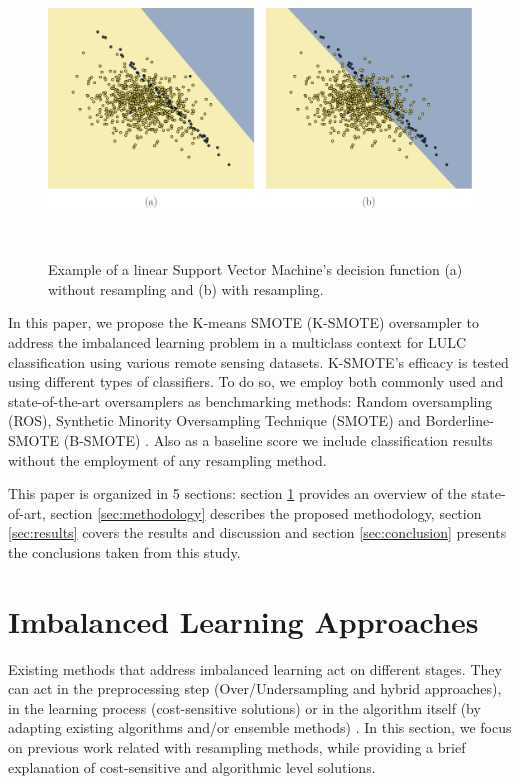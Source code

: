 \documentclass[parskip=full]{scrartcl}
\begin{document}
\begin{figure}[H]
	\centering
	\includegraphics[width=.85\linewidth]{../analysis/resampling_decision_function}
	\caption{Example of a linear Support Vector Machine's decision function (a) without
		resampling and (b) with resampling.
    }~\label{fig:oversampling_decision_function}
\end{figure}

In this paper, we propose the K-means SMOTE (K-SMOTE) \cite{Douzas2018}
oversampler to address the imbalanced learning problem in a multiclass context
for LULC classification using various remote sensing datasets. K-SMOTE's
efficacy is tested using different types of classifiers. To do so, we employ
both commonly used and state-of-the-art oversamplers as benchmarking methods:
Random oversampling (ROS), Synthetic Minority Oversampling Technique (SMOTE)
\cite{Chawla2002} and Borderline-SMOTE (B-SMOTE) \cite{Han2005}. Also as a
baseline score we include classification results without the employment of any
resampling method.

This paper is organized in 5 sections: section \ref{sec:sota} provides an
overview of the state-of-art, section \ref{sec:methodology} describes the
proposed methodology, section \ref{sec:results} covers the results and
discussion and section \ref{sec:conclusion} presents the conclusions taken from
this study.

\section{Imbalanced Learning Approaches} \label{sec:sota}

Existing methods that address imbalanced learning act on different stages. They
can act in the preprocessing step (Over/Undersampling and hybrid approaches), in
the learning process (cost-sensitive solutions) or in the algorithm itself (by
adapting existing algorithms and/or ensemble methods) \cite{Kaur2019}. In this
section, we focus on previous work related with resampling methods, while
providing a brief explanation of cost-sensitive and algorithmic level solutions.
\end{document}
